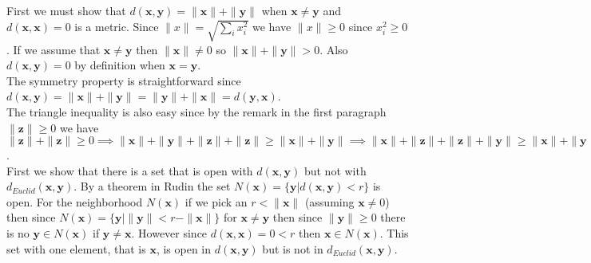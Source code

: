\documentclass[11pt,reqno]{article}
\begin{document}
First we must show that $d(\mathbf{x},\mathbf{y}) = \| \mathbf{x} \| + \| \mathbf{y} \|$ when $\mathbf{x} \neq \mathbf{y}$ and $d(\mathbf{x},\mathbf{x}) = 0$ is a metric. Since $\|x\| = \sqrt{\sum_i x_i^2}$ we have $\| x \| \ge 0$ since $x_i^2 \ge 0$. If we assume that $\mathbf{x} \neq \mathbf{y}$ then $\|\mathbf{x}\| \neq 0$ so  $\| \mathbf{x} \| + \|  \mathbf{y} \| > 0$. Also $d(\mathbf{x},\mathbf{y}) = 0$ by definition when $\mathbf{x} = \mathbf{y}$.\\
\indent The symmetry property is straightforward since $d(\mathbf{x},\mathbf{y})  =  \| \mathbf{x} \| + \| \mathbf{y} \| =  \| \mathbf{y} \| + \| \mathbf{x} \|  = d(\mathbf{y},\mathbf{x})$.\\
\indent The triangle inequality is also easy since by the remark in the first paragraph $\| \mathbf{z} \| \ge 0$ we have $\| \mathbf{z} \| + \| \mathbf{z} \| \ge 0 \implies \| \mathbf{x} \|  + \| \mathbf{y} \| +  \| \mathbf{z} \| + \| \mathbf{z} \| \ge \|  \mathbf{x} \|  + \| \mathbf{y} \|\implies \| \mathbf{x} \|  + \| \mathbf{z} \| +  \| \mathbf{z} \| + \| \mathbf{y} \| \ge \| \mathbf{x} \|  + \| \mathbf{y} \| \implies d(\mathbf{x},\mathbf{y}) \le d(\mathbf{x},\mathbf{z}) + d(\mathbf{z},\mathbf{x})$.\\
\indent First we show that there is a set that is open with $d(\mathbf{x},\mathbf{y})$ but not with $d_{Euclid}(\mathbf{x},\mathbf{y})$. By a theorem in Rudin the set $N(\mathbf{x}) = \{ \mathbf{y} | d(\mathbf{x},\mathbf{y}) < r \}$ is open. For the neighborhood $N(\mathbf{x})$ if we pick an $r < \| \mathbf{x} \|$ (assuming $\mathbf{x} \neq 0$) then since $N(\mathbf{x}) = \{ \mathbf{y} | \| \mathbf{y} \| < r - \| \mathbf{x} \| \}$ for $\mathbf{x} \neq \mathbf{y}$ then since $\|\mathbf{y}\| \ge 0$ there is no $\mathbf{y} \in N(\mathbf{x})$ if $\mathbf{y} \neq \mathbf{x}$. However since $d(\mathbf{x},\mathbf{x}) = 0 < r$ then $\mathbf{x} \in N(\mathbf{x})$. This set with one element, that is $\mathbf{x}$, is open in $d(\mathbf{x},\mathbf{y})$ but is not in $d_{Euclid}(\mathbf{x},\mathbf{y})$.\\
\end{document}
